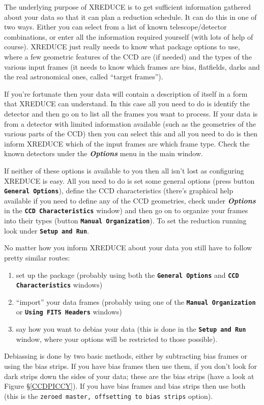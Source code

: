 \documentclass[twoside,11pt]{article}
\newcommand{\hyperref}[4]{#2\ref{#4}#3}
\newcommand{\htmlref}[2]{#1}
\newcommand{\latexhtml}[2]{#1}
\renewcommand{\_}{\texttt{\symbol{95}}}
\newcommand{\ttsize}{\latexhtml{\small}{}}
\newcommand{\butt}[1]{{\ttsize \bf \tt #1}}
\newcommand{\menu}[1]{{\ttsize \bf \em #1}}
\newcommand{\text}[1]{{\ttsize \tt #1}}
\newcommand{\routine}[1]{{\sc #1}}
\newcommand{\xroutine}[1]{\htmlref{{\sc #1}}{#1}}
\begin{document}
The underlying purpose of \xroutine{XREDUCE} is to get sufficient
information gathered about your data so that it can plan a reduction
schedule. It can do this in one of two ways. Either you can select
from a list of known telescope/detector combinations, or enter
all the information required yourself (with lots of help of course).
\routine{XREDUCE} just really needs to know what package options to
use, where a few geometric features of the CCD are (if needed) and the
types of the various input frames (it needs to know which frames are
bias, flatfields, darks and the real astronomical ones, called
``target frames'').

If you're fortunate then your data will contain a description of
itself in a form that \routine{XREDUCE} can understand. In this case
all you need to do is identify the detector and then go on to list all
the frames you want to process. If your data is from a detector with
limited information available (such as the geometries of the various
parts of the CCD) then you can select this and all you need to do is
then inform \routine{XREDUCE} which of the input frames are which frame
type. Check the known detectors under the \menu{Options} menu in the
main window.

If neither of these options is available to you then all isn't lost as
configuring \routine{XREDUCE} is easy. All you need to do is set some
general options (press button \butt{General Options}), define the CCD
characteristics (there's graphical help available if you need to
define any of the CCD geometries, check under \menu{Options} in the
\butt{CCD Characteristics} window) and then go on to organize your
frames into their types (button \butt{Manual Organization}). To set
the reduction running look under \butt{Setup and Run}.

No matter how you inform \routine{XREDUCE} about your data you still
have to follow pretty similar routes:
\begin{enumerate}
\item set up the package (probably using both the \butt{General Options}
and \butt{CCD Characteristics} windows)
\item ``import'' your data frames (probably using one of the
\butt{Manual Organization} or \butt{Using FITS Headers} windows)
\item say how you want to debias your data (this is done in the
\butt{Setup and Run} window, where your options will be restricted
to those possible).
\end{enumerate}
Debiassing is done by two basic methods, either by subtracting bias frames
or using the bias strips. If you have bias frames then use them, if
you don't look for dark strips down the sides of your data; these are
the bias strips (have a look at \hyperref{this figure}{Figure
\S}{}{CCDPICCY}).
If you have bias frames and bias strips then use both (this is the
\text{zeroed master, offsetting to bias strips} option).
\end{document}
